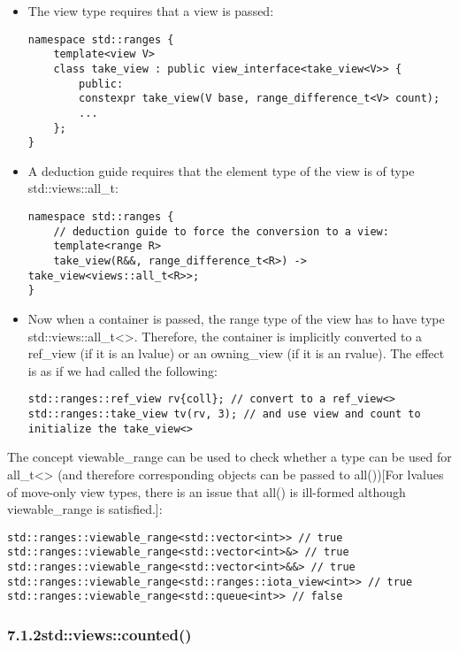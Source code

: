 \begin{itemize}
\item
The view type requires that a view is passed:

\begin{lstlisting}[style=styleCXX]
namespace std::ranges {
	template<view V>
	class take_view : public view_interface<take_view<V>> {
		public:
		constexpr take_view(V base, range_difference_t<V> count);
		...
	};
}
\end{lstlisting}

\item
A deduction guide requires that the element type of the view is of type std::views::all\_t:

\begin{lstlisting}[style=styleCXX]
namespace std::ranges {
	// deduction guide to force the conversion to a view:
	template<range R>
	take_view(R&&, range_difference_t<R>) -> take_view<views::all_t<R>>;
}
\end{lstlisting}

\item
Now when a container is passed, the range type of the view has to have type std::views::all\_t<>. Therefore, the container is implicitly converted to a ref\_view (if it is an lvalue) or an owning\_view (if it is an rvalue). The effect is as if we had called the following:

\begin{lstlisting}[style=styleCXX]
std::ranges::ref_view rv{coll}; // convert to a ref_view<>
std::ranges::take_view tv(rv, 3); // and use view and count to initialize the take_view<>
\end{lstlisting}
\end{itemize}

The concept viewable\_range can be used to check whether a type can be used for all\_t<> (and therefore corresponding objects can be passed to all())[For lvalues of move-only view types, there is an issue that all() is ill-formed although viewable\_range is satisfied.]:

\begin{lstlisting}[style=styleCXX]
std::ranges::viewable_range<std::vector<int>> // true
std::ranges::viewable_range<std::vector<int>&> // true
std::ranges::viewable_range<std::vector<int>&&> // true
std::ranges::viewable_range<std::ranges::iota_view<int>> // true
std::ranges::viewable_range<std::queue<int>> // false
\end{lstlisting}

\subsubsection*{ 7.1.2\hspace{0.2cm}std::views::counted()}

